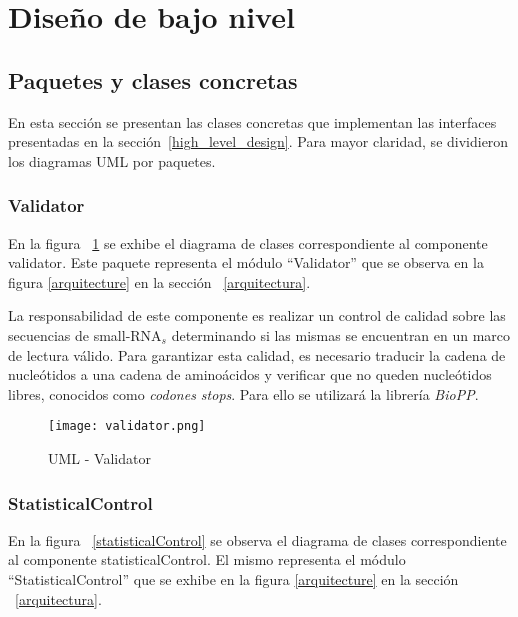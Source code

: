 \section{Diseño de bajo nivel}
\label{low_level_design}

\subsection{Paquetes y clases concretas}
En esta sección se presentan las clases concretas que implementan las interfaces presentadas en la 
sección~\ref{high_level_design}. Para mayor claridad, se dividieron los diagramas UML por paquetes.

\subsubsection{Validator}
\par En la figura ~\ref{validator} se exhibe el diagrama de clases correspondiente al componente \textsf{validator}. Este paquete representa el módulo ``Validator'' que se observa en la figura \ref{arquitecture} en la sección ~\ref{arquitectura}.

\par La responsabilidad de este componente es realizar un control de calidad sobre las secuencias de small-RNA$_s$ determinando si las mismas se encuentran en un marco de lectura válido. Para garantizar esta calidad, es necesario traducir la cadena de nucleótidos a una cadena de aminoácidos y verificar que no queden nucleótidos libres, conocidos como \emph{codones stops}. Para ello se utilizará la librería \emph{BioPP}.

\begin{figure}[!hbtp]
	\begin{center}
		\texttt{[image: validator.png]}
		\caption{UML - Validator}
		\label{validator}
	\end{center}
\end{figure}

\subsubsection{StatisticalControl}
\par En la figura ~\ref{statisticalControl} se observa el diagrama de clases correspondiente al componente \textsf{statisticalControl}. El mismo representa el módulo ``StatisticalControl'' que se exhibe en la figura \ref{arquitecture} en la sección ~\ref{arquitectura}.

